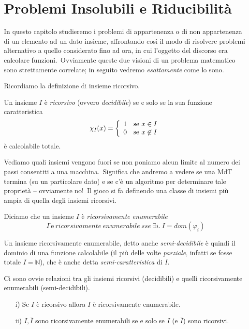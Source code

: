 \section{Problemi Insolubili e Riducibilità}

In questo capitolo studieremo i problemi di appartenenza o di non appartenenza di un elemento ad un dato insieme, affrontando così il modo di risolvere problemi alternativo a quello considerato fino ad ora, in cui l'oggetto del discorso era calcolare funzioni.\
Ovviamente queste due visioni di un problema matematico sono strettamente correlate; in seguito vedremo \textit{esattamente} come lo sono.

Ricordiamo la definizione di insieme ricorsivo.

\vspace{12pt}
\noindent Un insieme $I$ è \textit{ricorsivo} (ovvero \textit{decidibile}) se e solo se la sua funzione caratteristica
\[\chi_I(x)=\left\{\begin{array}{l l}
        1 & \text{se } x\in I       \\
        0 & \text{se } x \not \in I \\
    \end{array}\right.\]
è calcolabile totale.\

Vediamo quali insiemi vengono fuori se non poniamo alcun limite al numero dei passi consentiti a una macchina.\
Significa che andremo a vedere se una MdT termina (su un particolare dato) e se c'è un algoritmo per determinare tale proprietà -- ovviamente no!\
Il gioco si fa definendo una classe di insiemi più ampia di quella degli insiemi ricorsivi.

\begin{definition}
    \label{rec_enumerabile}
    Diciamo che un insieme $I$ è \textit{ricorsivamente enumerabile}
    \[I\ \mathrm{\grave{e}}\ \mathit{ricorsivamente\ enumerabile\ sse}\  \exists i.\ I = dom(\varphi_i)\]
\end{definition}

\noindent Un insieme ricorsivamente enumerabile, detto anche \textit{semi-decidibile} è quindi il dominio di una funzione calcolabile (il più delle volte \textit{parziale}, infatti se fosse totale $I = \mathbb{N}$), che è anche detta \textit{semi-caratteristica} di $I$.\

Ci sono ovvie relazioni tra gli insiemi ricorsivi (decidibili) e quelli ricorsivamente enumerabili (semi-decidibili).\

\begin{property}
    \label{R-RE}
    \hfill
    \begin{itemize}
        \item [i)] Se $I$ è ricorsivo allora $I$ è ricorsivamente enumerabile.
        \item [ii)] $I, \bar{I}$ sono ricorsivamente enumerabili se e solo se $I$ (e $\bar{I}$) sono ricorsivi.
    \end{itemize}
\end{property}

